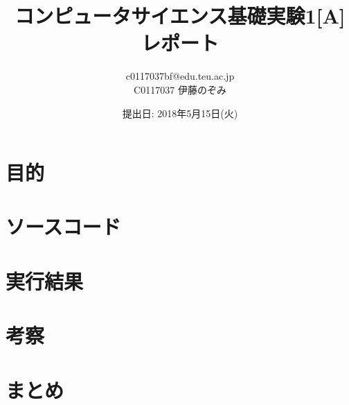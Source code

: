 \documentclass[uplatex]{jsarticle}
\begin{document}
\begin{titlepage}
  \title{コンピュータサイエンス基礎実験1[A] レポート}
  \date{提出日: 2018年5月15日(火)}
  \author{c0117037bf@edu.teu.ac.jp\\C0117037 伊藤のぞみ}
  \maketitle
  \thispagestyle{empty}
\end{titlepage}

\section{目的}

\section{ソースコード}
% 


\section{実行結果}

\section{考察}

\section{まとめ}






\end{document}
